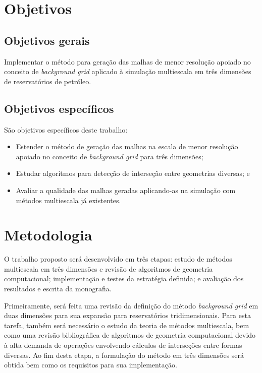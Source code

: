 \documentclass[a4paper, 10pt]{article}
\begin{document}
\clearpage
\section{Objetivos}

\subsection{Objetivos gerais}

Implementar o método para geração das malhas de menor resolução apoiado no conceito de \textit{background grid} aplicado à simulação multiescala em três dimensões de reservatórios de petróleo.

\subsection{Objetivos específicos}

São objetivos específicos deste trabalho:

\begin{itemize}
    \item Estender o método de geração das malhas na escala de menor resolução apoiado no conceito de \textit{background grid} para três dimensões;
    \item Estudar algoritmos para detecção de interseção entre geometrias diversas; e
    \item Avaliar a qualidade das malhas geradas aplicando-as na simulação com métodos multiescala já existentes.
\end{itemize}

\clearpage
\section{Metodologia}

O trabalho proposto será desenvolvido em três etapas: estudo de métodos multiescala em três dimensões e revisão de algoritmos de geometria computacional; implementação e testes da estratégia definida; e avaliação dos resultados e escrita da monografia.

Primeiramente, será feita uma revisão da definição do método \textit{background grid} em duas dimensões para sua expansão para reservatórios tridimensionais. Para esta tarefa, também será necessário o estudo da teoria de métodos multiescala, bem como uma revisão bibliográfica de algoritmos de geometria computacional devido à alta demanda de operações envolvendo cálculos de interseções entre formas diversas. Ao fim desta etapa, a formulação do método em três dimensões será obtida bem como os requisitos para sua implementação.
\end{document}
